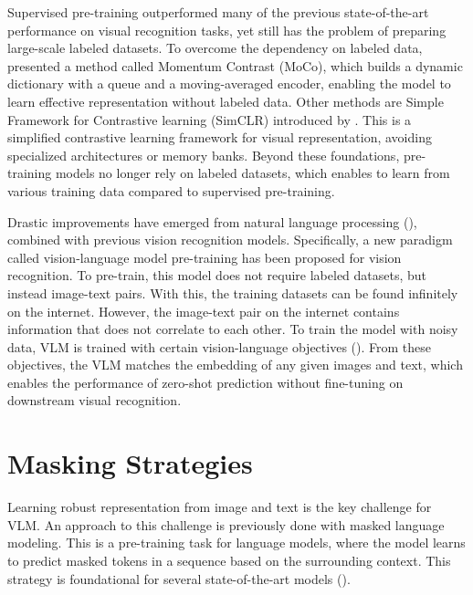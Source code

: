 Supervised pre-training outperformed many of the previous state-of-the-art performance on visual recognition tasks, yet still has the problem of preparing large-scale labeled datasets. To overcome the dependency on labeled data, \cite{he2020momentumcontrastunsupervisedvisual} presented a method called Momentum Contrast (MoCo), which builds a dynamic dictionary with a queue and a moving-averaged encoder, enabling the model to learn effective representation without labeled data. Other methods are Simple Framework for Contrastive learning (SimCLR) introduced by \cite{chen2020simpleframeworkcontrastivelearning}. This is a simplified contrastive learning framework for visual representation, avoiding specialized architectures or memory banks. Beyond these foundations, pre-training models no longer rely on labeled datasets, which enables to learn from various training data compared to supervised pre-training. 

Drastic improvements have emerged from natural language processing (\cite{devlin2018bert, brown2020language}), combined with previous vision recognition models. Specifically, a new paradigm called vision-language model pre-training has been proposed for vision recognition. To pre-train, this model does not require labeled datasets, but instead image-text pairs. With this, the training datasets can be found infinitely on the internet. However, the image-text pair on the internet contains information that does not correlate to each other. To train the model with noisy data, VLM is trained with certain vision-language objectives (\cite{radford2021learning, yu2022cocacontrastivecaptionersimagetext}). From these objectives, the VLM matches the embedding of any given images and text, which enables the performance of zero-shot prediction without fine-tuning on downstream visual recognition.


\section{Masking Strategies}
Learning robust representation from image and text is the key challenge for VLM. An approach to this challenge is previously done with masked language modeling. This is a pre-training task for language models, where the model learns to predict masked tokens in a sequence based on the surrounding context. This strategy is foundational for several state-of-the-art models (\cite{devlin2018bert, liu2020roberta}). 

